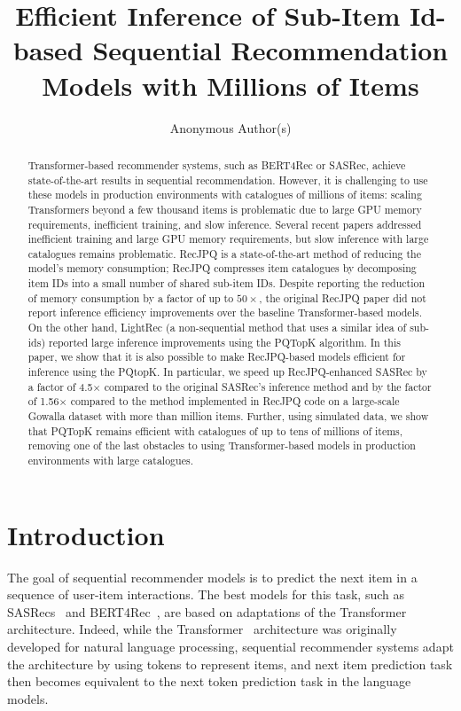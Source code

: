 \documentclass[sigconf,natbib=true, review=true]{acmart} %
\title{Efficient Inference of Sub-Item Id-based Sequential Recommendation Models with Millions of Items}
\author{Anonymous Author(s)}
\affiliation{%
  \institution{Organisation} \country{A Country}}
\newcommand{\rsasha}[1]{\textcolor[HTML]{FF0000}{#1}}
\begin{document}
\begin{abstract}
Transformer-based recommender systems, such as BERT4Rec or SASRec, achieve state-of-the-art results in sequential recommendation. However, it is challenging to use these models in production environments with catalogues of millions of items: scaling Transformers beyond a few thousand items is problematic due to large GPU memory requirements, inefficient training, and slow inference. Several recent papers addressed inefficient training and large GPU memory requirements, but slow inference with large catalogues remains problematic. %
RecJPQ is a state-of-the-art method of reducing the model's memory consumption; RecJPQ compresses item catalogues by decomposing item IDs into a small number of shared sub-item IDs. Despite reporting the reduction of memory consumption by a factor of up to $50\times$, the original RecJPQ paper did not report inference efficiency improvements over the baseline Transformer-based models. \rsasha{On the other hand, LightRec (a non-sequential method that uses a similar idea of sub-ids) reported large inference improvements using the PQTopK algorithm. In this paper, we show that it is also possible to make RecJPQ-based models efficient for inference using the PQtopK. } In particular, we speed up RecJPQ-enhanced SASRec by a factor of 4.5$\times$ compared to the original SASRec's inference method and by the factor of  1.56$\times$ compared to the method implemented in RecJPQ code on a large-scale Gowalla dataset with more than million items. Further, using simulated data, we show that PQTopK remains efficient with catalogues of up to tens of millions of items, removing one of the last obstacles to using Transformer-based models in production environments with large catalogues.
\end{abstract}

\maketitle

\section{Introduction}
The goal of sequential recommender models is to predict the next item in a sequence of user-item interactions. The best models for this task, such as SASRecs~\cite{SASRec} and BERT4Rec~\cite{BERT4Rec}, are based on adaptations of the Transformer~\cite{Transformer} architecture. 
Indeed, while the Transformer~\cite{Transformer} architecture was originally developed for natural language processing, sequential recommender systems adapt the architecture by using tokens to represent items, \rsasha{and next item prediction task then becomes equivalent to the next token prediction task in the language models.}
\end{document}
